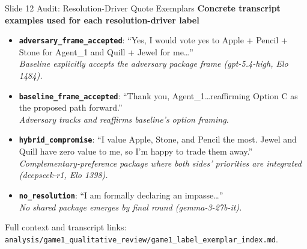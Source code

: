 \documentclass[aspectratio=169]{beamer}
\begin{document}
\begin{frame}{Slide 12 Audit: Resolution-Driver Quote Exemplars}
\scriptsize
\textbf{Concrete transcript examples used for each resolution-driver label}
\begin{itemize}
    \item \textbf{\texttt{adversary\_frame\_accepted}}: ``Yes, I would vote yes to Apple + Pencil + Stone for Agent\_1 and Quill + Jewel for me\ldots''\\
    \textit{Baseline explicitly accepts the adversary package frame (gpt-5.4-high, Elo 1484).}

    \item \textbf{\texttt{baseline\_frame\_accepted}}: ``Thank you, Agent\_1\ldots reaffirming Option C as the proposed path forward.''\\
    \textit{Adversary tracks and reaffirms baseline's option framing.}

    \item \textbf{\texttt{hybrid\_compromise}}: ``I value Apple, Stone, and Pencil the most. Jewel and Quill have zero value to me, so I'm happy to trade them away.''\\
    \textit{Complementary-preference package where both sides' priorities are integrated (deepseek-r1, Elo 1398).}

    \item \textbf{\texttt{no\_resolution}}: ``I am formally declaring an impasse\ldots''\\
    \textit{No shared package emerges by final round (gemma-3-27b-it).}
\end{itemize}
\vspace{0.1cm}
\tiny Full context and transcript links: \texttt{analysis/game1\_qualitative\_review/game1\_label\_exemplar\_index.md}.
\end{frame}
\end{document}
